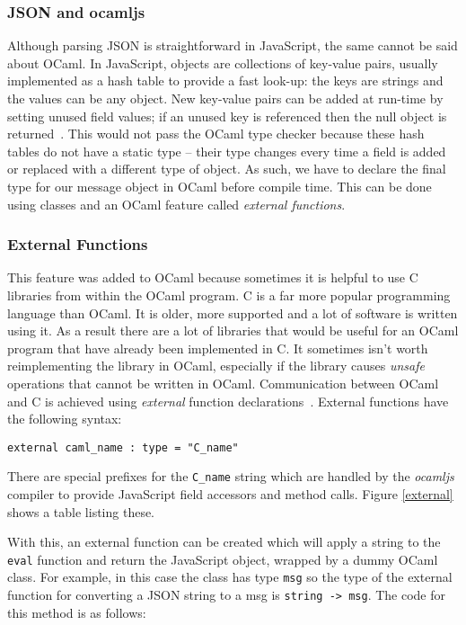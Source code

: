 \subsubsection{JSON and ocamljs}
Although parsing JSON is straightforward in JavaScript, the same cannot be said about OCaml. In JavaScript, objects are collections of key-value pairs, usually implemented as a hash table to provide a fast look-up: the keys are strings and the values can be any object. New key-value pairs can be added at run-time by setting unused field values; if an unused key is referenced then the null object is returned~\cite{bib:crock_js}. This would not pass the OCaml type checker because these hash tables do not have a static type -- their type changes every time a field is added or replaced with a different type of object. As such, we have to declare the final type for our message object in OCaml before compile time. This can be done using classes and an OCaml feature called \emph{external functions}.

\subsubsection{External Functions}
This feature was added to OCaml because sometimes it is helpful to use C libraries from within the OCaml program. C is a far more popular programming language than OCaml. It is older, more supported and a lot of software is written using it. As a result there are a lot of libraries that would be useful for an OCaml program that have already been implemented in C. It sometimes isn't worth reimplementing the library in OCaml, especially if the library causes \emph{unsafe} operations that cannot be written in OCaml. Communication between OCaml and C is achieved using \emph{external} function declarations~\cite{bib:ocaml}. External functions have the following syntax:

\begin{center}
\texttt{external caml\_name : type = "C\_name"}
\end{center}

There are special prefixes for the \texttt{C\_name} string which are handled by the \emph{ocamljs} compiler to provide JavaScript field accessors and method calls. Figure \ref{external} shows a table listing these.

With this, an external function can be created which will apply a string to the \texttt{eval} function and return the JavaScript object, wrapped by a dummy OCaml class. For example, in this case the class has type \texttt{msg} so the type of the external function for converting a JSON string to a msg is \texttt{string -> msg}. The code for this method is as follows:

